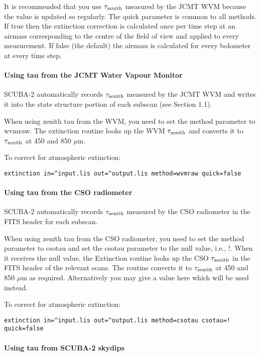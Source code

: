 \documentclass[twoside,11pt]{article}
\renewcommand{\_}{\texttt{\symbol{95}}}
\begin{document}
It is recommended that you use $\tau_{\rm zenith}$ measured by the
JCMT WVM because the value is updated so regularly. The quick
parameter is common to all methods. If true then the extinction
correction is calculated once per time step at an airmass
corresponding to the centre of the field of view and applied to every
measurement. If false (the default) the airmass is calculated for
every bolometer at every time step. 

\paragraph{Using tau from the JCMT Water Vapour Monitor}

SCUBA-2 automatically records $\tau_{\rm zenith}$ measured by the JCMT
WVM and writes it into the state structure portion of each subscan
(see Section 1.1).

When using zenith tau from the WVM, you need to set the method
parameter to wvmraw. The extinction routine looks up the WVM
$\tau_{\rm zenith}$ and converts it to $\tau_{\rm zenith}$ at 450 and
850 $\mu$m.

To correct for atmospheric extinction:
\begin{verbatim}
extinction in=^input.lis out=^output.lis method=wvmraw quick=false
\end{verbatim}

\paragraph{Using tau from the CSO radiometer}

SCUBA-2 automatically records $\tau_{\rm zenith}$ measured by the CSO
radiometer in the FITS header for each subscan.

When using zenith tau from the CSO radiometer, you need to set the
method parameter to csotau and set the csotau parameter to the null
value, i.e., !. When it receives the null value, the Extinction
routine looks up the CSO $\tau_{\rm zenith}$ in the FITS header of the
relevant scans. The routine converts it to $\tau_{\rm zenith}$ at 450
and 850 $\mu$m as required. Alternatively you may give a value here
which will be used instead.

To correct for atmospheric extinction:
\begin{verbatim}
extinction in=^input.lis out=^output.lis method=csotau csotau=! quick=false
\end{verbatim}


\paragraph{Using tau from SCUBA-2 skydips}
\end{document}
